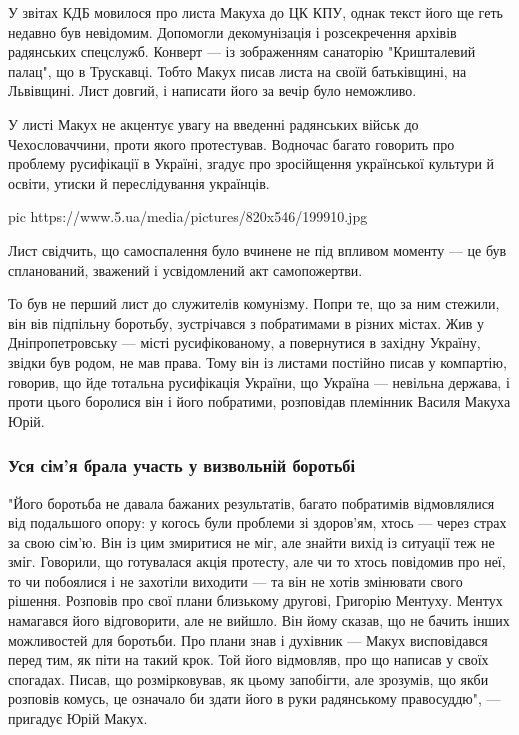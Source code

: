 У звітах КДБ мовилося про листа Макуха до ЦК КПУ, однак текст його ще
геть недавно був невідомим. Допомогли декомунізація і розсекречення
архівів радянських спецслужб. Конверт --- із зображенням санаторію
"Кришталевий палац", що в Трускавці. Тобто Макух писав листа на своїй
батьківщині, на Львівщині. Лист довгий, і написати його за вечір було
неможливо.

У листі Макух не акцентує увагу на введенні радянських військ до
Чехословаччини, проти якого протестував. Водночас багато говорить про
проблему русифікації в Україні, згадує про зросійщення української
культури й освіти, утиски й переслідування українців.

\ifcmt
pic https://www.5.ua/media/pictures/820x546/199910.jpg
\fi


Лист свідчить, що самоспалення було вчинене не під впливом моменту --- це був
спланований, зважений і усвідомлений акт самопожертви.

То був не перший лист до служителів комунізму. Попри те, що за ним стежили, він
вів підпільну боротьбу, зустрічався з побратимами в різних містах. Жив у
Дніпропетровську --- місті русифікованому, а повернутися в західну Україну,
звідки був родом, не мав права. Тому він із листами постійно писав у компартію,
говорив, що йде тотальна русифікація України, що Україна --- невільна держава, і
проти цього боролися він і його побратими, розповідав племінник Василя Макуха
Юрій.

\subsubsection{Уся сім'я брала участь у визвольній боротьбі}

"Його боротьба не давала бажаних результатів, багато побратимів
відмовлялися від подальшого опору: у когось були проблеми зі здоров'ям,
хтось --- через страх за свою сім'ю. Він із цим змиритися не міг, але знайти
вихід із ситуації теж не зміг. Говорили, що готувалася акція протесту, але
чи то хтось повідомив про неї, то чи побоялися і не захотіли виходити --- та
він не хотів змінювати свого рішення. Розповів про свої плани близькому
другові, Григорію Ментуху. Ментух намагався його відговорити, але не
вийшло. Він йому сказав, що не бачить інших можливостей для боротьби. Про
плани знав і духівник --- Макух висповідався перед тим, як піти на такий
крок. Той його відмовляв, про що написав у своїх спогадах. Писав, що
розмірковував, як цьому запобігти, але зрозумів, що якби розповів комусь,
це означало би здати його в руки радянському правосуддю", --- пригадує Юрій
Макух.

